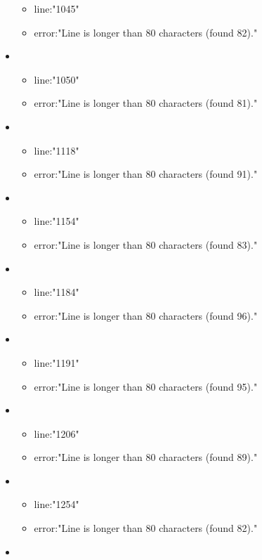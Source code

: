 \begin{itemize}
\begin{itemize}
		\item line:"1045" 
		\item error:"Line is longer than 80 characters (found 82)." 
	\end{itemize}
	\item 
	\begin{itemize} 
		\item line:"1050" 
		\item error:"Line is longer than 80 characters (found 81)." 
	\end{itemize}
	\item 
	\begin{itemize} 
		\item line:"1118" 
		\item error:"Line is longer than 80 characters (found 91)." 
	\end{itemize}
	\item 
	\begin{itemize} 
		\item line:"1154" 
		\item error:"Line is longer than 80 characters (found 83)." 
	\end{itemize}
	\item 
	\begin{itemize} 
		\item line:"1184" 
		\item error:"Line is longer than 80 characters (found 96)." 
	\end{itemize}
	\item 
	\begin{itemize} 
		\item line:"1191" 
		\item error:"Line is longer than 80 characters (found 95)." 
	\end{itemize}
	\item 
	\begin{itemize} 
		\item line:"1206" 
		\item error:"Line is longer than 80 characters (found 89)." 
	\end{itemize}
	\item 
	\begin{itemize} 
		\item line:"1254" 
		\item error:"Line is longer than 80 characters (found 82)." 
	\end{itemize}
	\item 
	\begin{itemize} 

\end{itemize}
\end{itemize}
